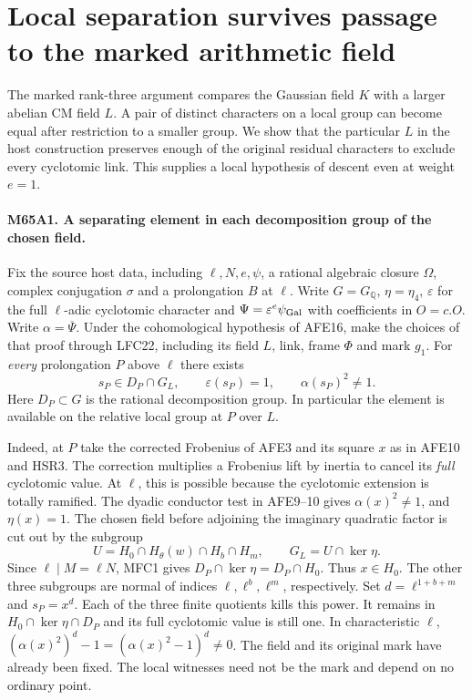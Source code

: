 \section{Local separation survives passage to the marked arithmetic field}
\label{sec:marked65}
The marked rank-three argument compares the Gaussian field $K$ with a
larger abelian CM field $L$. A pair of distinct characters on a local
group can become equal after restriction to a smaller group. We show
that the particular $L$ in the host construction preserves enough of
the original residual characters to exclude every cyclotomic link.
This supplies a local hypothesis of descent even at weight $e=1$.

\paragraph{M65A1. A separating element in each decomposition group of the chosen field.}
Fix the source host data, including $\ell,N,e,\psi$, a rational
algebraic closure $\Omega$, complex conjugation $\sigma$ and a
prolongation $B$ at $\ell$. Write $G=G_{\mathbb Q}$,
$\eta=\eta_4$, $\varepsilon$ for the full $\ell$-adic cyclotomic
character and $\Psi=\varepsilon^e\psi_{\rm Gal}$ with coefficients
in $O=c.O$. Write $\alpha=\overline\Psi$. Under the cohomological
hypothesis of AFE16, make the choices of that proof through LFC22,
including its field $L$, link, frame $\Phi$ and mark $g_1$. For
\emph{every} prolongation $P$ above $\ell$ there exists
\[
 s_P\in D_P\cap G_L,\qquad \varepsilon(s_P)=1,\qquad
                      \alpha(s_P)^2\ne1 .
\]
Here $D_P\subset G$ is the rational decomposition group. In particular
the element is available on the relative local group at $P$ over $L$.

Indeed, at $P$ take the corrected Frobenius of AFE3 and its square $x$
as in AFE10 and HSR3. The correction multiplies a Frobenius lift by
inertia to cancel its \emph{full} cyclotomic value. At $\ell$, this is
possible because the cyclotomic extension is totally ramified. The
dyadic conductor test in AFE9--10 gives
$\alpha(x)^2\ne1$, and $\eta(x)=1$. The chosen field before adjoining
the imaginary quadratic factor is cut out by the subgroup
\[
 U=H_0\cap H_\theta(w)\cap H_b\cap H_m,\qquad G_L=U\cap\ker\eta .
\]
Since $\ell\mid M=\ell N$, MFC1 gives
$D_P\cap\ker\eta=D_P\cap H_0$. Thus $x\in H_0$. The other three
subgroups are normal of indices $\ell,\ell^b,\ell^m$, respectively.
Set $d=\ell^{1+b+m}$ and $s_P=x^d$. Each of the three finite
quotients kills this power. It remains in $H_0\cap\ker\eta\cap D_P$
and its full cyclotomic value is still one. In characteristic $\ell$,
$(\alpha(x)^2)^d-1=(\alpha(x)^2-1)^d\ne0$.
The field and its original mark have already been fixed. The local
witnesses need not be the mark and depend on no ordinary point.

